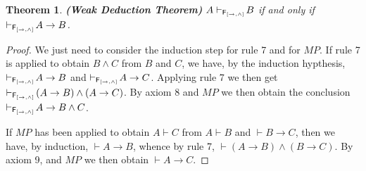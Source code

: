 \documentclass[12pt]{article}
\newtheorem{thm}{Theorem}[section]
\newtheorem{prop}[thm]{Proposition}
\begin{document}

\begin{thm}
\em\textbf{(Weak Deduction Theorem)} $A\vdash_{{\sf F_{[\rightarrow, \wedge]}} }\!B  $ if and only if $\vdash_{{\sf F_{[\rightarrow, \wedge]}} }\! A\rightarrow B $.
\end{thm}
\begin{proof}%
We just need to consider the induction step for rule 7 and for $M\!P$. If rule 7 is applied to obtain $B\wedge C$ from $B$ and $C$, we have, by the induction hypthesis,  $\vdash_{{\sf F_{[\rightarrow, \wedge]}} }\!A\rightarrow B  $ and  $\vdash_{{\sf F_{[\rightarrow, \wedge]}} }\!A\rightarrow C  $. Applying rule 7 we then get  $\vdash_{{\sf F_{[\rightarrow, \wedge]}} }\!(A\rightarrow B)\wedge(A\rightarrow C)  $. By axiom 8 and $M\!P$ we then obtain the conclusion $\vdash_{{\sf F_{[\rightarrow, \wedge]}} }\!A\rightarrow B\wedge C  $.

If $M\!P$ has been applied to obtain $A\vdash C$ from $A\vdash B$ and $\vdash B\rightarrow C$, then we have, by induction,
$\vdash A\rightarrow B$, whence by rule 7, $\vdash (A\rightarrow B)\wedge (B\rightarrow C)$. By axiom 9, and $M\!P$ we then obtain $\vdash A\rightarrow C$.
\end{proof}
  

\end{document}
